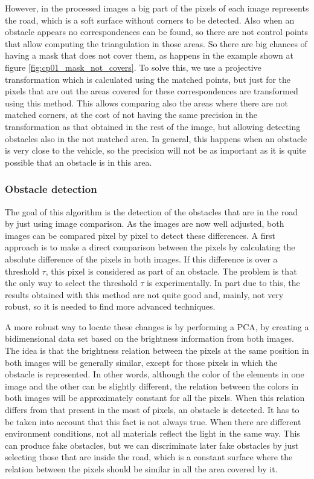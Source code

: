 However, in the processed images a big part of the pixels of each image represents the road, which is a soft surface without corners to be detected. Also when an obstacle appears no correspondences can be found, so there are not control points that allow computing the triangulation in those areas. So there are big chances of having a mask that does not cover them, as happens in the example shown at figure \ref{fig:cp01_mask_not_covers}. To solve this, we use a projective transformation which is calculated using the matched points, but just for the pixels that are out the areas covered for these correspondences are transformed using this method. This allows comparing also the areas where there are not matched corners, at the cost of not having the same precision in the transformation as that obtained in the rest of the image, but allowing detecting obstacles also in the not matched area. In general, this happens when an obstacle is very close to the vehicle, so the precision will not be as important as it is quite possible that an obstacle is in this area.

\subsubsection{Obstacle detection}\label{ch:chapter01_01_03_02}

The goal of this algorithm is the detection of the obstacles that are in the road by just using image comparison. As the images are now well adjusted, both images can be compared pixel by pixel to detect these differences. A first approach is to make a direct comparison between the pixels by calculating the absolute difference of the pixels in both images. If this difference is over a threshold $\tau$, this pixel is considered as part of an obstacle. The problem is that the only way to select the threshold $\tau$ is experimentally. In part due to this, the results obtained with this method are not quite good and, mainly, not very robust, so it is needed to find more advanced techniques.

A more robust way to locate these changes is by performing a \ac{PCA}, by creating a bidimensional data set based on the brightness information from both images. The idea is that the brightness relation between the pixels at the same position in both images will be generally similar, except for those pixels in which the obstacle is represented. In other words, although the color of the elements in one image and the other can be slightly different, the relation between the colors in both images will be approximately constant for all the pixels. When this relation differs from that present in the most of pixels, an obstacle is detected. It has to be taken into account that this fact is not always true. When there are different environment conditions, not all materials reflect the light in the same way. This can produce fake obstacles, but we can discriminate later fake obstacles by just selecting those that are inside the road, which is a constant surface where the relation between the pixels should be similar in all the area covered by it.

